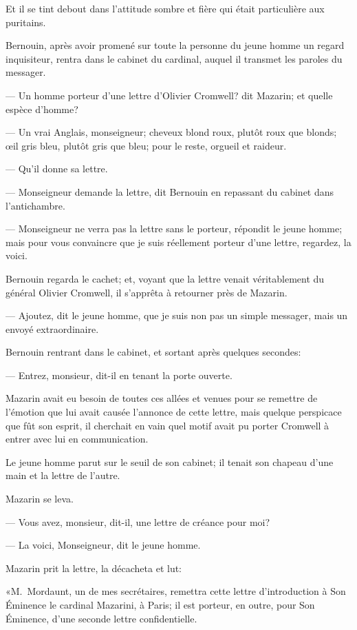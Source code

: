Et il se tint debout dans l'attitude sombre et fière qui était particulière aux puritains.

Bernouin, après avoir promené sur toute la personne du jeune homme un regard inquisiteur, rentra dans le cabinet du cardinal, auquel il transmet les paroles du messager.

— Un homme porteur d'une lettre d'Olivier Cromwell? dit Mazarin; et quelle espèce d'homme?

— Un vrai Anglais, monseigneur; cheveux blond roux, plutôt roux que blonds; œil gris bleu, plutôt gris que bleu; pour le reste, orgueil et raideur.

— Qu'il donne sa lettre.

— Monseigneur demande la lettre, dit Bernouin en repassant du cabinet dans l'antichambre.

— Monseigneur ne verra pas la lettre sans le porteur, répondit le jeune homme; mais pour vous convaincre que je suis réellement porteur d'une lettre, regardez, la voici.

Bernouin regarda le cachet; et, voyant que la lettre venait véritablement du général Olivier Cromwell, il s'apprêta à retourner près de Mazarin.

— Ajoutez, dit le jeune homme, que je suis non pas un simple messager, mais un envoyé extraordinaire.

Bernouin rentrant dans le cabinet, et sortant après quelques secondes:

— Entrez, monsieur, dit-il en tenant la porte ouverte.

Mazarin avait eu besoin de toutes ces allées et venues pour se remettre de l'émotion que lui avait causée l'annonce de cette lettre, mais quelque perspicace que fût son esprit, il cherchait en vain quel motif avait pu porter Cromwell à entrer avec lui en communication.

Le jeune homme parut sur le seuil de son cabinet; il tenait son chapeau d'une main et la lettre de l'autre.

Mazarin se leva.

— Vous avez, monsieur, dit-il, une lettre de créance pour moi?

— La voici, Monseigneur, dit le jeune homme.

Mazarin prit la lettre, la décacheta et lut:

«M.~Mordaunt, un de mes secrétaires, remettra cette lettre d'introduction à Son Éminence le cardinal Mazarini, à Paris; il est porteur, en outre, pour Son Éminence, d'une seconde lettre confidentielle.

